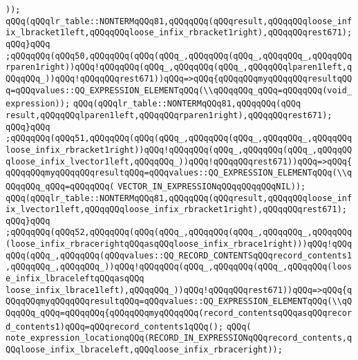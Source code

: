 \verb|));|\newline
\verb|qQQq(qQQqlr_table::NONTERMqQQq81,qQQqqQQq(qQQqresult,qQQqqQQqloose_infix_lbracket1left,qQQqqQQqloose_infix_rbracket1right),qQQqqQQqrest671);|\newline
\verb|qQQq}qQQq|\newline
\verb|;qQQqqQQq(qQQq50,qQQqqQQq(qQQq(qQQq_,qQQqqQQq(qQQq_,qQQqqQQq_,qQQqqQQqrparen1right))qQQq!qQQqqQQq(qQQq_,qQQqqQQq(qQQq_,qQQqqQQqlparen1left,qQQqqQQq_))qQQq!qQQqqQQqrest671))qQQq=>qQQq{qQQqqQQqmyqQQqqQQqresultqQQq=qQQqvalues::QQ_EXPRESSION_ELEMENTqQQq(\\qQQqqQQq_qQQq=qQQqqQQq(void_expression));|\newline
\verb|qQQq(qQQqlr_table::NONTERMqQQq81,qQQqqQQq(qQQq|\newline
\verb|result,qQQqqQQqlparen1left,qQQqqQQqrparen1right),qQQqqQQqrest671);|\newline
\verb|qQQq}qQQq|\newline
\verb|;qQQqqQQq(qQQq51,qQQqqQQq(qQQq(qQQq_,qQQqqQQq(qQQq_,qQQqqQQq_,qQQqqQQqloose_infix_rbracket1right))qQQq!qQQqqQQq(qQQq_,qQQqqQQq(qQQq_,qQQqqQQqloose_infix_lvector1left,qQQqqQQq_))qQQq!qQQqqQQqrest671))qQQq=>qQQq{qQQqqQQqmyqQQqqQQqresultqQQq=qQQqvalues::QQ_EXPRESSION_ELEMENTqQQq(\\qQQqqQQq_qQQq=qQQqqQQq(|\newline
\verb|VECTOR_IN_EXPRESSIONqQQqqQQqqQQqNIL));|\newline
\verb|qQQq(qQQqlr_table::NONTERMqQQq81,qQQqqQQq(qQQqresult,qQQqqQQqloose_infix_lvector1left,qQQqqQQqloose_infix_rbracket1right),qQQqqQQqrest671);|\newline
\verb|qQQq}qQQq|\newline
\verb|;qQQqqQQq(qQQq52,qQQqqQQq(qQQq(qQQq_,qQQqqQQq(qQQq_,qQQqqQQq_,qQQqqQQq(loose_infix_rbracerightqQQqasqQQqloose_infix_rbrace1right)))qQQq!qQQqqQQq(qQQq_,qQQqqQQq(qQQqvalues::QQ_RECORD_CONTENTSqQQqrecord_contents1,qQQqqQQq_,qQQqqQQq_))qQQq!qQQqqQQq(qQQq_,qQQqqQQq(qQQq_,qQQqqQQq(loose_infix_lbraceleftqQQqasqQQq|\newline
\verb|loose_infix_lbrace1left),qQQqqQQq_))qQQq!qQQqqQQqrest671))qQQq=>qQQq{qQQqqQQqmyqQQqqQQqresultqQQq=qQQqvalues::QQ_EXPRESSION_ELEMENTqQQq(\\qQQqqQQq_qQQq=qQQqqQQq{qQQqqQQqmyqQQqqQQq(record_contentsqQQqasqQQqrecord_contents1)qQQq=qQQqrecord_contents1qQQq();|\newline
\verb|qQQq(|\newline
\verb|note_expression_locationqQQq(RECORD_IN_EXPRESSIONqQQqrecord_contents,qQQqloose_infix_lbraceleft,qQQqloose_infix_rbraceright));|\newline
